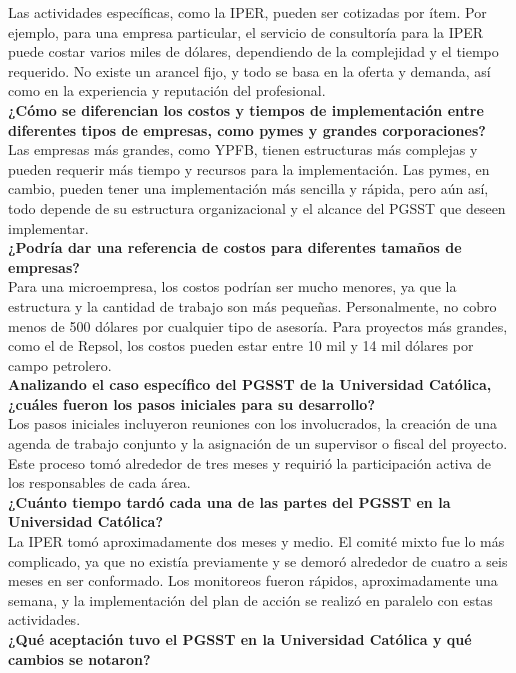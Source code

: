 Las actividades específicas, como la IPER, pueden ser cotizadas por ítem. Por ejemplo, para una empresa particular, el servicio de consultoría para la IPER puede costar varios miles de dólares, dependiendo de la complejidad y el tiempo requerido. No existe un arancel fijo, y todo se basa en la oferta y demanda, así como en la experiencia y reputación del profesional.
\\
\noindent
\textbf{¿Cómo se diferencian los costos y tiempos de implementación entre diferentes tipos de empresas, como pymes y grandes corporaciones?}\\
Las empresas más grandes, como YPFB, tienen estructuras más complejas y pueden requerir más tiempo y recursos para la implementación. Las pymes, en cambio, pueden tener una implementación más sencilla y rápida, pero aún así, todo depende de su estructura organizacional y el alcance del PGSST que deseen implementar.
\\
\noindent
\textbf{¿Podría dar una referencia de costos para diferentes tamaños de empresas?}\\
Para una microempresa, los costos podrían ser mucho menores, ya que la estructura y la cantidad de trabajo son más pequeñas. Personalmente, no cobro menos de 500 dólares por cualquier tipo de asesoría. Para proyectos más grandes, como el de Repsol, los costos pueden estar entre 10 mil y 14 mil dólares por campo petrolero.
\\
\noindent
\textbf{Analizando el caso específico del PGSST de la Universidad Católica, ¿cuáles fueron los pasos iniciales para su desarrollo?}\\
Los pasos iniciales incluyeron reuniones con los involucrados, la creación de una agenda de trabajo conjunto y la asignación de un supervisor o fiscal del proyecto. Este proceso tomó alrededor de tres meses y requirió la participación activa de los responsables de cada área.
\\
\noindent
\textbf{¿Cuánto tiempo tardó cada una de las partes del PGSST en la Universidad Católica?}\\
La IPER tomó aproximadamente dos meses y medio. El comité mixto fue lo más complicado, ya que no existía previamente y se demoró alrededor de cuatro a seis meses en ser conformado. Los monitoreos fueron rápidos, aproximadamente una semana, y la implementación del plan de acción se realizó en paralelo con estas actividades.
\\
\noindent
\textbf{¿Qué aceptación tuvo el PGSST en la Universidad Católica y qué cambios se notaron?}\\

